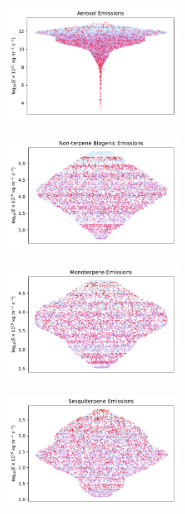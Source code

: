 \begin{figure}[H]
    \centering
    \begin{subfigure}
        \centering
        \includegraphics[width=0.49\textwidth,valign=t]{sosaa-data/figures/trajectories/trajectory-15.05.2018:19.00-aerosols.pdf}
    \end{subfigure}
    \begin{subfigure}
        \centering
        \includegraphics[width=0.49\textwidth,valign=t]{sosaa-data/figures/trajectories/trajectory-15.05.2018:19.00-biogenic.pdf}
    \end{subfigure}
    
    \begin{subfigure}
        \centering
        \includegraphics[width=0.49\textwidth,valign=t]{sosaa-data/figures/trajectories/trajectory-15.05.2018:19.00-monoterpenes.pdf}
    \end{subfigure}
    \begin{subfigure}
        \centering
        \includegraphics[width=0.49\textwidth,valign=t]{sosaa-data/figures/trajectories/trajectory-15.05.2018:19.00-sesquiterpenes.pdf}
    \end{subfigure}


\end{figure}
